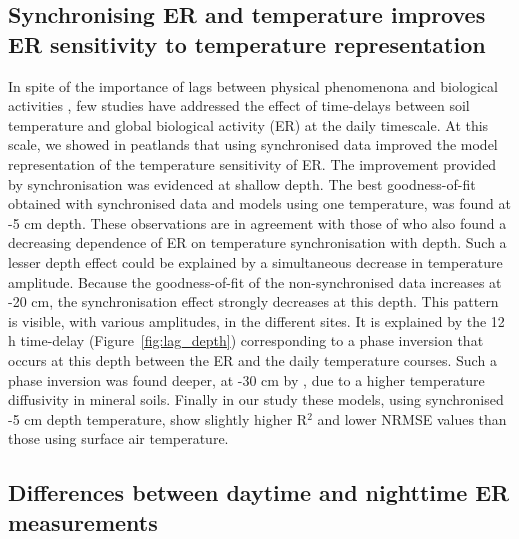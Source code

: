 \subsection{Synchronising ER and temperature improves ER sensitivity to temperature representation}

In spite of the importance of lags between physical phenomenona and biological activities \citep{vargas2010}, few studies have addressed the effect of time-delays between soil temperature and global biological activity (ER) at the daily timescale.
At this scale, we showed in peatlands that using synchronised data improved the model representation of the temperature sensitivity of ER.
The improvement provided by synchronisation was evidenced at shallow depth.
The best goodness-of-fit obtained with synchronised data and models using one temperature, was found at -5 cm depth.
These observations are in agreement with those of \citet{pavelka2007} who also found a decreasing dependence of ER on temperature synchronisation with depth.
Such a lesser depth effect could be explained by a simultaneous decrease in temperature amplitude.
Because the goodness-of-fit of the non-synchronised data increases at -20 cm, the synchronisation effect  strongly decreases at this depth.
This pattern is visible, with various amplitudes, in the different sites.
It is explained by the 12 h time-delay (Figure~\ref{fig:lag_depth}) corresponding to a phase inversion that occurs at this depth between the ER and the daily temperature courses.
Such a phase inversion was found deeper, at -30 cm by \citet{pavelka2007}, due to a higher temperature diffusivity in mineral soils.
Finally in our study these models, using synchronised -5 cm depth temperature, show slightly higher R$^2$ and lower NRMSE values than those using surface air temperature.

\subsection{Differences between daytime and nighttime ER measurements}

